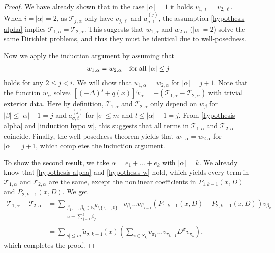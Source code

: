 \documentclass [oneside,11pt] {amsart}
\numberwithin{equation}{section}
\newcommand{\LC}{\left(}
\newcommand{\RC}{\right)}
\begin{document}
\begin{proof}
We have already shown that in the case $|\alpha|=1$ it holds $v_{1,\ell}=v_{2,\ell}$. When $i=|\alpha|=2$, as $\mathcal{T}_{j,\alpha}$ only have $v_{j,\ell}$ and $a_{\sigma, 1}^{(j)}$, the assumption \eqref{hypothesis alpha} implies $\mathcal{T}_{1,\alpha}=\mathcal{T}_{2,\alpha}$. This suggests that $w_{1,\alpha}$ and $w_{2,\alpha}$ ($|\alpha|=2$) solve the same Dirichlet problems, and thus they must be identical due to well-posedness.     

Now we apply the induction argument by assuming that 
\begin{align}\label{induction hypo w}
w_{1,\alpha} =w_{2,\alpha} \quad\hbox{for all $|\alpha|\leq j$}
\end{align}
holds for any $2\leq j<i$. We will show that $w_{1,\alpha} =w_{2,\alpha}$ for $|\alpha|=j+1$.
Note that the function $ \widetilde{w}_\alpha$ solves $[(-\Delta)^s + q(x)]\widetilde{w}_{\alpha}=-(\mathcal{T}_{1,\alpha}-\mathcal{T}_{2,\alpha})$ with trivial exterior data. 
Here by definition, $\mathcal{T}_{1,\alpha}$ and $\mathcal{T}_{2,\alpha}$ only depend on $w_\beta$ for $|\beta|\leq |\alpha|-1=j$ and $a^{(j)}_{\sigma,t}$ for $|\sigma|\leq m$ and $t\leq |\alpha|-1=j$. From \eqref{hypothesis alpha} and \eqref{induction hypo w}, this suggests that all terms in $\mathcal{T}_{1,\alpha}$ and $\mathcal{T}_{2,\alpha}$ coincide. Finally, the well-posedness theorem yields that $w_{1,\alpha} = w_{2,\alpha}$ for $|\alpha|=j+1$, which completes the induction argument.


To show the second result, we take $\alpha=e_{1}+\ldots+e_{k}$ with $|\alpha|=k$. We already know that \eqref{hypothesis alpha} and \eqref{hypothesis w} hold, which yields every term in $\mathcal{T}_{1,\alpha}$ and $\mathcal{T}_{2,\alpha}$ are the same, except the nonlinear coefficients in $P_{1,k-1}(x,D)$ and $P_{2,k-1}(x,D)$. We get
\begin{align*}
\mathcal{T}_{1,\alpha} -\mathcal{T}_{2,\alpha}&=\sum_{\substack{\beta_1,\ldots, \beta_{k}\in \mathbb{N}^K_0\setminus \{0,\cdots,0\} : \\ \alpha= \sum_{j=1}^k \beta_j }}v_{\beta_1}\ldots v_{\beta_{k-1}}(P_{1,k-1}(x,D)-P_{2,k-1}(x,D))v_{\beta_k}\\
&=\sum_{|\sigma|\le m} \widetilde{a}_{\sigma, k-1}(x)\LC \sum_{\pi\in S_k} v_{\pi_1}\ldots v_{\pi_{k-1}}D^\sigma v_{\pi_k}\RC,
\end{align*}
which completes the proof.
\end{proof}
\end{document}
